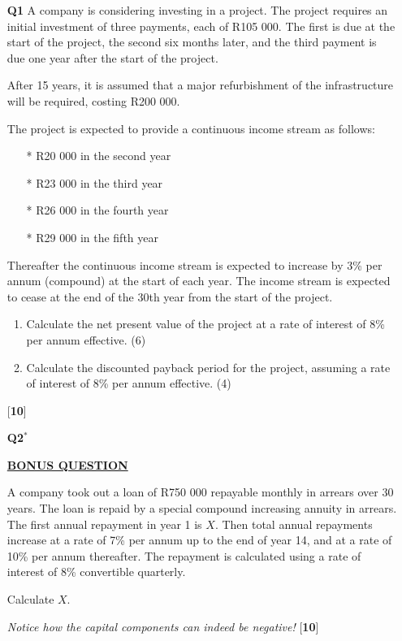 \documentclass[a4paper,12pt]{article}
\begin{document}
\begin{enumerate}
    \item[\textbf{Q1}] %
    A company is considering investing in a project. The project requires an initial investment of three payments, 
    each of R105 000. The first is due at the start of the project,
    the second six months later, 
    and the third payment is due one year after the start of the project.

    After 15 years, it is assumed that a major refurbishment of the infrastructure will be
    required, costing R200 000.
    
    The project is expected to provide a continuous income
    stream as follows:

    \begin{itemize}
        \item [*] R20 000 in the second year
        \item [*] R23 000 in the third year
        \item [*] R26 000 in the fourth year
        \item [*] R29 000 in the fifth year
    \end{itemize}

    Thereafter the continuous income stream is expected to increase by 3\% per annum
    (compound) at the start of each year. The income stream is expected to cease at the
    end of the 30th year from the start of the project.

    \begin{enumerate}
        \item Calculate the net present value of the project at a rate of interest of 8\% per annum
        eﬀective.
        \hfill (6)
        \item Calculate the discounted payback period for the project, assuming a rate of interest of 8\% per annum eﬀective. 
        \hfill (4)
    \end{enumerate}

    \hfill [\textbf{10}]

    \item[\textbf{Q2\(^{*}\)}] %
    \begin{center}
        \underline{\textbf{BONUS QUESTION}}
    \end{center}
    \item[] 
    A company took out a loan of R750 000 repayable monthly in arrears over 30 years.
    The loan is repaid by a special compound increasing annuity in arrears. The first annual repayment in year 1 is \(X\). 
    Then total annual repayments increase at a rate of 7\% per annum up to the end of year 14, and at a rate of 10\% per annum thereafter.
    The repayment is calculated using a rate of interest of 8\% convertible quarterly.

    Calculate \(X\).

    \textit{Notice how the capital components can indeed be negative!}
    \hfill [\textbf{10}]
\end{enumerate}
\end{document}
